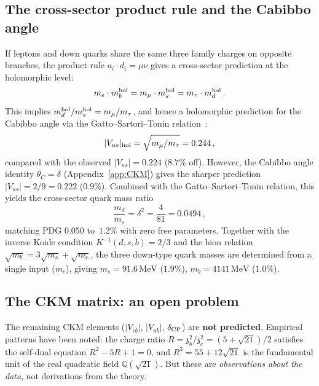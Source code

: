 \documentclass[12pt,a4paper]{article}
\newcommand{\MeV}{\,\mathrm{MeV}}
\newcommand{\zch}{\mathfrak{z}}
\begin{document}
\subsection{The cross-sector product rule and the Cabibbo angle}

If leptons and down quarks share the same three family charges
on opposite branches, the product rule $a_i \cdot d_i = \mu\nu$
gives a cross-sector prediction at the holomorphic level:
\begin{equation}
  m_e \cdot m_b^{\rm hol} = m_\mu \cdot m_s^{\rm hol}
  = m_\tau \cdot m_d^{\rm hol}\,.
  \label{eq:cross_sector}
\end{equation}
This implies $m_d^{\rm hol}/m_s^{\rm hol} = m_\mu/m_\tau$,
and hence a holomorphic prediction for the Cabibbo angle via the
Gatto--Sartori--Tonin relation~\cite{GattoSartoriTonin:1968}:
\begin{equation}
  |V_{us}|_{\rm hol} = \sqrt{m_\mu/m_\tau} = 0.244\,,
  \label{eq:Vus_hol}
\end{equation}
compared with the observed $|V_{us}| = 0.224$ ($8.7\%$ off).
However, the Cabibbo angle identity $\theta_C = \delta$
(Appendix~\ref{app:CKM}) gives the sharper prediction
$|V_{us}| = 2/9 = 0.222$ ($0.9\%$).
Combined with the Gatto--Sartori--Tonin relation, this yields
the cross-sector quark mass ratio
\begin{equation}
  \frac{m_d}{m_s} = \delta^2 = \frac{4}{81} = 0.0494\,,
  \label{eq:md_over_ms}
\end{equation}
matching PDG $0.050$ to~$1.2\%$ with zero free parameters.
Together with the inverse Koide condition $K^{-1}(d,s,b) = 2/3$
and the bion relation $\sqrt{m_b} = 3\sqrt{m_s} + \sqrt{m_c}$,
the three down-type quark masses are determined from a single input
($m_c$), giving $m_s = 91.6\MeV$ ($1.9\%$),
$m_b = 4141\MeV$ ($1.0\%$).


\subsection{The CKM matrix: an open problem}

The remaining CKM elements ($|V_{cb}|$, $|V_{ub}|$,
$\delta_{\rm CP}$) are \textbf{not predicted}.
Empirical patterns have been noted: the charge ratio
$R = \zch_b^2/\zch_c^2 = (5+\sqrt{21})/2$ satisfies the
self-dual equation $R^2 - 5R + 1 = 0$, and
$R^3 = 55 + 12\sqrt{21}$ is the fundamental unit of the real
quadratic field $\mathbb{Q}(\sqrt{21})$.
But these are \emph{observations about the data}, not derivations
from the theory.
\end{document}
